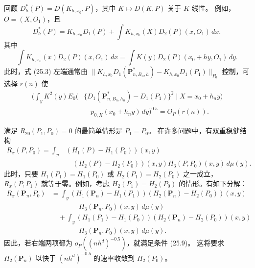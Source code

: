 回顾 $D_h^*(P)=D(K_{h,x_0},P)$，其中 $K\mapsto D(K,P)$ 关于 $K$ 线性。
例如，$O=(X,O_1)$，且
\[
 D_h^*(P)=K_{h,x_0}D_1(P)
 +\int K_{h,x_0}(X)D_2(P)(x,O_1)\,dx,
\]
其中
\[
 \int K_{h,x_0}(x)D_2(P)(x,O_1)\,dx
 =\int K(y)D_2(P)(x_0+hy,O_1)\,dy.
\]
此时，式 (25.3) 左端通常由
$\|K_{h,x_0}D_1(\mathbf P^*_{n,B_n,h})-K_{h,x_0}D_1(P_1)\|_{P_0}$
控制，可选择 $r(n)$ 使
\[
\begin{aligned}
 \biggl(\int_y K^2(y)E_0\bigl(
 &\{D_1(\mathbf P^*_{n,B_n,h_n})-D_1(P_1)\}^2
 \mid X=x_0+h_ny\bigr)\\
 &\quad p_{0,X}(x_0+h_ny)\,dy\biggr)^{0.5}
 =O_P(r(n)).
\end{aligned}
\]

满足 $R_{20}(P_1,P_0)=0$ 的最简单情形是 $P_1=P_0$。
在许多问题中，有双重稳健结构
\[
\begin{aligned}
 R_x(P,P_0)=\int_y
 &(H_1(P)-H_1(P_0))(x,y)\\
 &\quad(H_2(P)-H_2(P_0))(x,y)H_3(P,P_0)(x,y)\,d\mu(y).
\end{aligned}
\]
此时，只要 $H_1(P_1)=H_1(P_0)$ 或 $H_2(P_1)=H_2(P_0)$ 之一成立，
$R_x(P,P_1)$ 就等于零。例如，考虑 $H_2(P_1)=H_2(P_0)$ 的情形。有如下分解：
\[
\begin{aligned}
 R_x(\mathbf P_n,P_0)
 &=\int_y(H_1(\mathbf P_n)-H_1(P_1))
   (H_2(\mathbf P_n)-H_2(P_0))(x,y)\\
 &\qquad\qquad H_3(\mathbf P_n,P_0)(x,y)\,d\mu(y)\\
 &\quad+\int_y(H_1(P_1)-H_1(P_0))
   (H_2(\mathbf P_n)-H_2(P_0))(x,y)\\
 &\qquad\qquad H_3(\mathbf P_n,P_0)(x,y)\,d\mu(y).
\end{aligned}
\]
因此，若右端两项都为 $o_P((nh^d)^{-0.5})$，就满足条件 (25.9)。
这将要求 $H_2(\mathbf P_n)$ 以快于 $(nh^d)^{-0.5}$ 的速率收敛到 $H_2(P_0)$。

